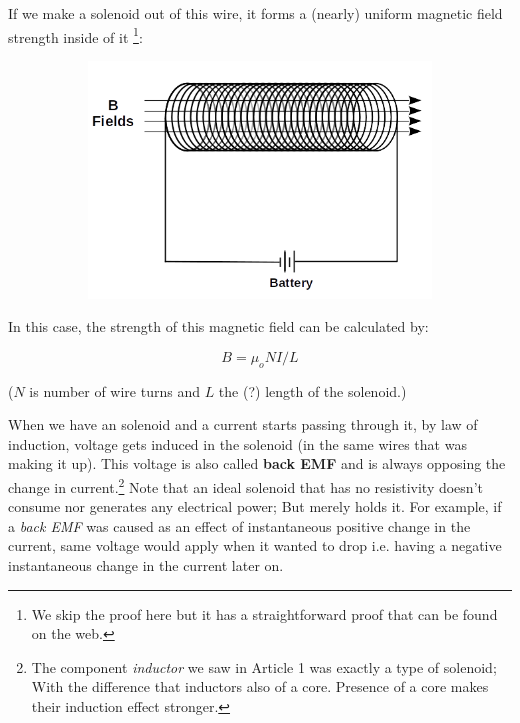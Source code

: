 \documentclass{article}
\begin{document}
	If we make a solenoid out of this wire, it forms a (nearly) uniform magnetic field strength inside of it \footnote[1]{We skip the proof here but it has a straightforward proof that can be found on the web.}:
	
	\begin{figure}[h!]
	\centering
	\begin{subfigure}[b]{0.7\linewidth}
	\includegraphics[width=\linewidth]{solenoid.png}
	\end{subfigure}
	\end{figure}
	
	In this case, the strength of this magnetic field can be calculated by:
	
	$$ B = \mu_o N I / L$$
	
	($N$ is number of wire turns and $L$ the (?) length of the solenoid.)
		
	When we have an solenoid and a current starts passing through it, by law of induction, voltage gets induced in the solenoid (in the same wires that was making it up).
	This voltage is also called \textbf{back EMF} and is always opposing the change in current.\footnote[1]{The component \textit{inductor} we saw in Article 1 was exactly a type of solenoid; With the difference that inductors also of a core. Presence of a core makes their induction effect stronger.}
	Note that an ideal solenoid that has no resistivity doesn't consume nor generates any electrical power; But merely holds it.
	For example, if a \textit{back EMF} was caused as an effect of instantaneous positive change in the current, same voltage would apply when it wanted to drop i.e. having a negative instantaneous change in the current later on.
	
\end{document}
